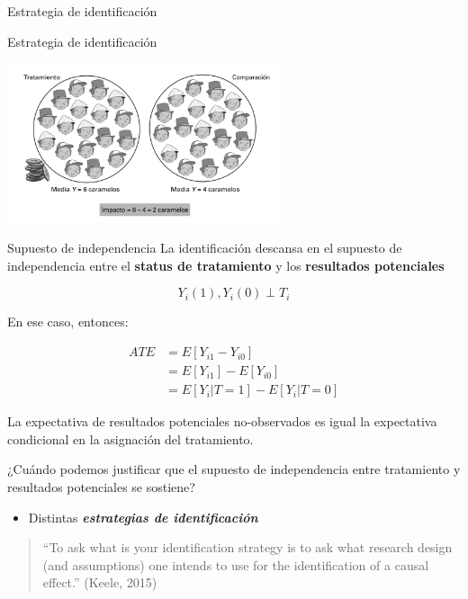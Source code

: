 \documentclass[
  ignorenonframetext,
]{beamer}
\providecommand{\tightlist}{%
  \setlength{\itemsep}{0pt}\setlength{\parskip}{0pt}}
\begin{document}
\begin{frame}{Estrategia de identificación}
\begin{frame}{Estrategia de identificación}
\center

\includegraphics[width=0.6\textwidth,height=\textheight]{figs/comparacion}
\end{frame}

\begin{frame}{Supuesto de independencia}
\protect\hypertarget{supuesto-de-independencia}{}
La identificación descansa en el supuesto de independencia entre el
\textbf{status de tratamiento} y los \textbf{resultados potenciales}

\[ Y_{i}(1), Y_{i}(0) \perp T_i \]

\pause

En ese caso, entonces:

\[
\begin{aligned}
ATE &=  E[Y_{i1} - Y_{i0}] \\
    &=  E[Y_{i1}] - E[Y_{i0}] \\
    &=  E[Y_{i} | T=1 ] - E[Y_{i} | T=0]
\end{aligned}
\]

La expectativa de resultados potenciales no-observados es igual la
expectativa condicional en la asignación del tratamiento.
\end{frame}

\begin{frame}{}
\protect\hypertarget{section}{}
¿Cuándo podemos justificar que el supuesto de independencia entre
tratamiento y resultados potenciales se sostiene?

\begin{itemize}
\tightlist
\item
  Distintas \textbf{\emph{estrategias de identificación}}
\end{itemize}

\vspace{16pt}

\begin{quote}
``To ask what is your identification strategy is to ask what research
design (and assumptions) one intends to use for the identification of a
causal effect.'' (Keele, 2015)
\end{quote}
\end{frame}


\end{frame}
\end{document}
